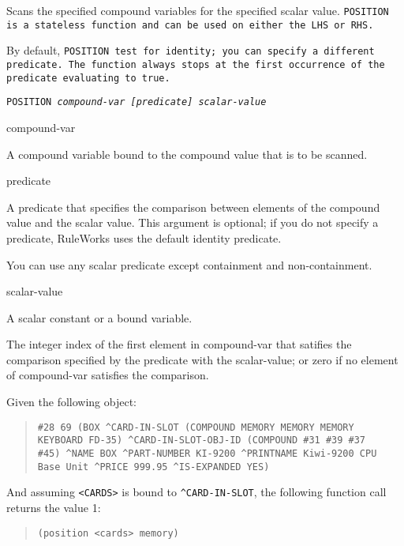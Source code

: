 {{Scans the specified compound variables for the specified scalar
value. \tt{POSITION} is a stateless function and can be used on either
the LHS or RHS.

By default, \tt{POSITION} test for identity; you can specify a
different predicate. The function always stops at the first occurrence
of the predicate evaluating to true.

\Format

\tt{POSITION} \it{compound-var} [\it{predicate}] \it{scalar-value}

\begin{arguments}
\item[compound-var]

  A compound variable bound to the compound value that is to be
  scanned.

\item[predicate]

  A predicate that specifies the comparison between elements of the
  compound value and the scalar value. This argument is optional; if
  you do not specify a predicate, RuleWorks uses the default identity
  predicate.

  You can use any scalar predicate except containment and
  non-containment.

\item[scalar-value]

  A scalar constant or a bound variable.
\end{arguments}

\ReturnValue

The integer index of the first element in compound-var that
satifies the comparison specified by the predicate with the
scalar-value; or zero if no element of compound-var satisfies
the comparison.

\Example

Given the following object:
\begin{quote}
\begin{verbatim}
#28 69 (BOX ^CARD-IN-SLOT (COMPOUND MEMORY MEMORY MEMORY
KEYBOARD FD-35) ^CARD-IN-SLOT-OBJ-ID (COMPOUND #31 #39 #37
#45) ^NAME BOX ^PART-NUMBER KI-9200 ^PRINTNAME Kiwi-9200 CPU
Base Unit ^PRICE 999.95 ^IS-EXPANDED YES)
\end{verbatim}
\end{quote}
And assuming \verb|<CARDS>| is bound to \verb|^CARD-IN-SLOT|, the following
function call returns the value 1:
\begin{quote}
\begin{verbatim}
(position <cards> memory)
\end{verbatim}
\end{quote}

}}
